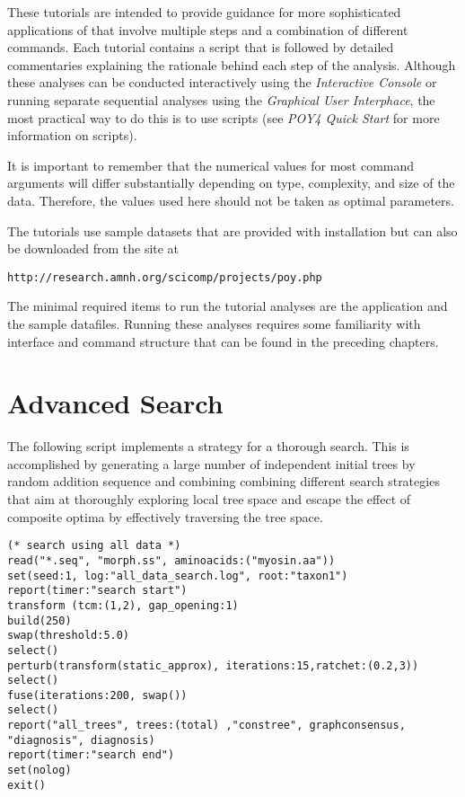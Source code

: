 These tutorials are intended to provide guidance for more sophisticated applications of \poy that involve multiple steps and a combination of different commands. Each tutorial contains a \poy script that is followed by detailed commentaries explaining the rationale behind each step of the analysis. Although these analyses can be conducted interactively using the \emph{Interactive Console} or running separate sequential analyses using the \emph{Graphical User Interphace}, the most practical way to do this is to use \poy scripts (see \emph{ POY4 Quick Start} for more information on \poy scripts).

It is important to remember that the numerical values for most command arguments will differ substantially depending on type, complexity, and size of the data. Therefore, the values used here should not be taken as optimal parameters.

The tutorials use sample datasets that are provided with \poy installation but can also be downloaded from the \poy site at
\begin{center}
\texttt{http://research.amnh.org/scicomp/projects/poy.php}
\end{center}
The minimal required items to run the tutorial analyses are the \poy application and the sample datafiles. Running these analyses requires some familiarity with \poy interface and command structure that can be found in the preceding chapters.

\section{Advanced Search}{\label{tutorial1}}
The following script implements a strategy for a thorough search. This is accomplished by generating a large number of independent initial trees by random addition sequence and combining combining different search strategies that aim at thoroughly exploring local tree space and escape the effect of composite optima by effectively traversing the tree space.

\begin{verbatim}
(* search using all data *)
read("*.seq", "morph.ss", aminoacids:("myosin.aa"))
set(seed:1, log:"all_data_search.log", root:"taxon1")
report(timer:"search start")
transform (tcm:(1,2), gap_opening:1)
build(250)
swap(threshold:5.0)
select()
perturb(transform(static_approx), iterations:15,ratchet:(0.2,3))
select()
fuse(iterations:200, swap())
select()
report("all_trees", trees:(total) ,"constree", graphconsensus,
"diagnosis", diagnosis)
report(timer:"search end")
set(nolog)
exit()
\end{verbatim}

